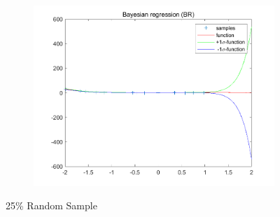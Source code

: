 \documentclass{article}
\begin{document}
\begin{figure}[H]
\begin{subfigure}[b]{0.475\textwidth}
        \includegraphics[width=\textwidth]{fig/1c-25-br.png} 
    \end{subfigure}
    \caption{25\% Random Sample}
\end{figure}
\end{document}
